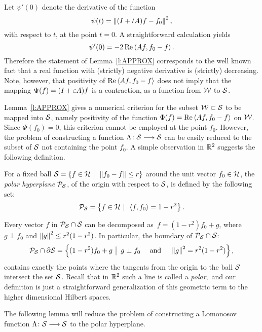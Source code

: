 \newpage

\begin{rem}
Let $\psi'(0)$ denote the derivative of the function
\[ \psi(t)=\left\Vert(I+t{A})f-f_0\right\Vert^2, \]
with respect to $t$, at the point $t=0$. A straightforward
calculation yields
\[ \psi'(0)=-2\operatorname{Re}\left<A{f},f_0-f\right>. \]
Therefore the statement of Lemma~\ref{l:APPROX} corresponds to
the well known fact that a real function with (strictly)
negative derivative is (strictly) decreasing. Note, however,
that positivity of $\operatorname{Re}\left<A{f},f_0-f\right>$ does not imply that
the mapping $\Psi(f)=(I+\varepsilon A)f$ is a contraction, as a
function from ${\cal W}$ to ${\cal S}$.
\end{rem}

\medskip

Lemma~\ref{l:APPROX} gives a numerical criterion for the subset
${\cal W}\subset{\cal S}$ to be mapped into ${\cal S}$, namely positivity of the
function $\Phi(f)=\operatorname{Re}\left<A{}f,f_0-f\right>$ on ${\cal W}$. Since
$\Phi(f_0)=0$, this criterion cannot be employed at the point
$f_0$. However, the problem of constructing a function
$\Lambda\colon{\cal S}\longrightarrow{\cal S}$ can be easily reduced to the subset of
${\cal S}$ not containing the point $f_0$. A simple observation in
$\mathbb R^2$ suggests the following definition.

\newcommand{\Polar}{{\cal P}_{\s}}
\begin{defn}
For a fixed ball ${\cal S}=\left\{f\in{\cal H}\,\,|\,\,\, \left\Vert f_0-f\right\Vert\leq
r\right\}$ around the unit vector $f_0\in{\cal H}$, the {\em polar
hyperplane} $\Polar$, of the origin with respect to ${\cal S}$, is
defined by the following set:
\[ \Polar = \set{f\in\h\,\,|\,\,\, \seq{f,f_0}=1-r^2}. \]
\end{defn}

\begin{rem}
Every vector $f$ in $\Polar\cap\s$ can be decomposed as\, $ f =
(1-r^2)f_0 + g$, where $g\perp f_0$ and $\left\Vert g\right\Vert^2\leq
r^2(1-r^2)$. In particular, the boundary of $\Polar\cap\s$:
\[ \Polar \cap \partial \s = \set{(1-r^2)f_0 + g\,\,\big|\,\,\,
   g\perp f_0 \quad\text{ and }\quad \norm{g}^2=r^2(1-r^2)}, \]
contains exactly the points where the tangents from the origin
to the ball ${\cal S}$ intersect the set ${\cal S}$. Recall that in
$\mathbb R^2$ such a line is called a {\em polar},\, and our
definition is just a straightforward generalization of this
geometric term to the higher dimensional Hilbert spaces.
\end{rem}

\medskip

The following lemma will reduce the problem of constructing a
Lomonosov function $\Lambda\colon{\cal S}\longrightarrow{\cal S}$ to the polar
hyperplane.

